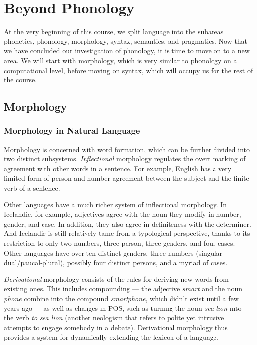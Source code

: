 \chapter{Beyond Phonology}
\label{cha:Morph}

At the very beginning of this course, we split language into the subareas phonetics, phonology, morphology, syntax, semantics, and pragmatics.
Now that we have concluded our investigation of phonology, it is time to move on to a new area.
We will start with morphology, which is very similar to phonology on a computational level, before moving on syntax, which will occupy us for the rest of the course.

\section{Morphology}

\subsection{Morphology in Natural Language}

Morphology is concerned with word formation, which can be further divided into two distinct subsystems.
\emph{Inflectional} morphology regulates the overt marking of agreement with other words in a sentence.
For example, English has a very limited form of person and number agreement between the subject and the finite verb of a sentence.
%
\begin{exe}
    \ex
    \begin{xlist}
    \end{xlist}
\end{exe}
%
Other languages have a much richer system of inflectional morphology.
In Icelandic, for example, adjectives agree with the noun they modify in number, gender, and case.
In addition, they also agree in definiteness with the determiner.
And Icelandic is still relatively tame from a typological perspective, thanks to its restriction to only two numbers, three person, three genders, and four cases.
Other languages have over ten distinct genders, three numbers (singular-dual\slash paucal-plural), possibly four distinct persons, and a myriad of cases.

\emph{Derivational} morphology consists of the rules for deriving new words from existing ones.
This includes compounding --- the adjective \emph{smart} and the noun \emph{phone} combine into the compound \emph{smartphone}, which didn't exist until a few years ago --- as well as changes in POS, such as turning the noun \emph{sea lion} into the verb \emph{to sea lion} (another neologism that refers to polite yet intrusive attempts to engage somebody in a debate).
Derivational morphology thus provides a system for dynamically extending the lexicon of a language.

